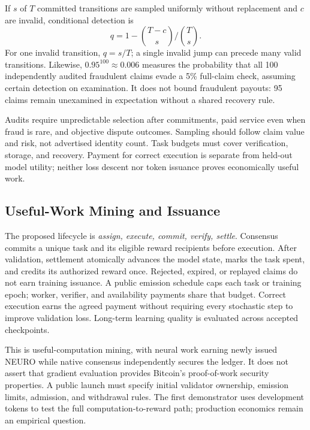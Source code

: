 \documentclass[conference]{IEEEtran}
\begin{document}
If $s$ of $T$ committed transitions are sampled uniformly without replacement and $c$ are invalid, conditional detection is
\begin{equation}
 q=1-\binom{T-c}{s}\big/\binom{T}{s}.
\end{equation}
For one invalid transition, $q=s/T$; a single invalid jump can precede many valid transitions. Likewise, $0.95^{100}\approx0.006$ measures the probability that all 100 independently audited fraudulent claims evade a 5\% full-claim check, assuming certain detection on examination. It does not bound fraudulent payouts: 95 claims remain unexamined in expectation without a shared recovery rule.

Audits require unpredictable selection after commitments, paid service even when fraud is rare, and objective dispute outcomes. Sampling should follow claim value and risk, not advertised identity count. Task budgets must cover verification, storage, and recovery. Payment for correct execution is separate from held-out model utility; neither loss descent nor token issuance proves economically useful work.

\subsection{Useful-Work Mining and Issuance}

The proposed lifecycle is \emph{assign, execute, commit, verify, settle}. Consensus commits a unique task and its eligible reward recipients before execution. After validation, settlement atomically advances the model state, marks the task spent, and credits its authorized reward once. Rejected, expired, or replayed claims do not earn training issuance. A public emission schedule caps each task or training epoch; worker, verifier, and availability payments share that budget. Correct execution earns the agreed payment without requiring every stochastic step to improve validation loss. Long-term learning quality is evaluated across accepted checkpoints.

This is useful-computation mining, with neural work earning newly issued NEURO while native consensus independently secures the ledger. It does not assert that gradient evaluation provides Bitcoin's proof-of-work security properties. A public launch must specify initial validator ownership, emission limits, admission, and withdrawal rules. The first demonstrator uses development tokens to test the full computation-to-reward path; production economics remain an empirical question.
\end{document}
